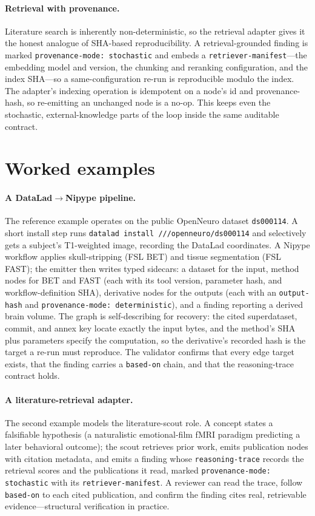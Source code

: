 \documentclass[preprint]{glimmer-paper}
\newcommand{\code}[1]{\texttt{#1}}
\newcommand{\node}[1]{\textsf{#1}}
\begin{document}
\paragraph{Retrieval with provenance.} Literature search is inherently non-deterministic,
so the retrieval adapter gives it the honest analogue of SHA-based reproducibility. A
retrieval-grounded \node{finding} is marked \code{provenance-mode: stochastic} and embeds a
\code{retriever-manifest}---the embedding model and version, the chunking and reranking
configuration, and the index SHA---so a same-configuration re-run is reproducible modulo
the index. The adapter's indexing operation is idempotent on a node's id and
provenance-hash, so re-emitting an unchanged node is a no-op. This keeps even the
stochastic, external-knowledge parts of the loop inside the same auditable contract.

\section{Worked examples}
\label{sec:examples}

\paragraph{A DataLad$\rightarrow$Nipype pipeline.} The reference example operates on the
public OpenNeuro dataset \code{ds000114}. A short install step runs
\code{datalad install ///openneuro/ds000114} and selectively gets a subject's T1-weighted
image, recording the DataLad coordinates. A Nipype workflow applies skull-stripping (FSL
BET) and tissue segmentation (FSL FAST); the emitter then writes typed sidecars: a
\node{dataset} for the input, \node{method} nodes for BET and FAST (each with its tool
version, parameter hash, and workflow-definition SHA), \node{derivative} nodes for the
outputs (each with an \code{output-hash} and \code{provenance-mode: deterministic}), and a
\node{finding} reporting a derived brain volume. The graph is self-describing for recovery:
the cited superdataset, commit, and annex key locate exactly the input bytes, and the
method's SHA plus parameters specify the computation, so the derivative's recorded hash is
the target a re-run must reproduce. The validator confirms that every edge target exists,
that the finding carries a \code{based-on} chain, and that the reasoning-trace contract
holds.

\paragraph{A literature-retrieval adapter.} The second example models the literature-scout
role. A \node{concept} states a falsifiable hypothesis (a naturalistic emotional-film fMRI
paradigm predicting a later behavioral outcome); the scout retrieves prior work, emits
\node{publication} nodes with citation metadata, and emits a \node{finding} whose
\code{reasoning-trace} records the retrieval scores and the publications it read, marked
\code{provenance-mode: stochastic} with its \code{retriever-manifest}. A reviewer can read
the trace, follow \code{based-on} to each cited publication, and confirm the finding cites
real, retrievable evidence---structural verification in practice.
\end{document}
